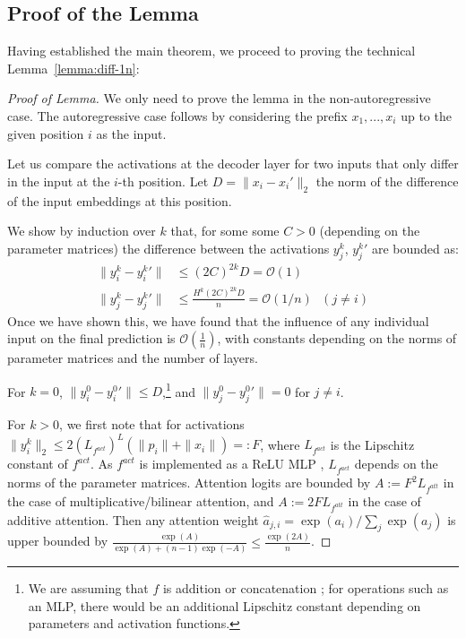 \documentclass[11pt,a4paper]{article}
\newcounter{theorem}
\begin{document}
\subsection{Proof of the Lemma}
Having established the main theorem, we proceed to proving the technical Lemma~\ref{lemma:diff-1n}:
\begin{proof}[Proof of Lemma]
We only need to prove the lemma in the non-autoregressive case.
The autoregressive case follows by considering the prefix $x_1, ..., x_i$ up to the given position $i$ as the input.

Let us compare the activations at the decoder layer for two inputs that only differ in the input at the $i$-th position.
Let $D = \|x_i-x_i'\|_2$ the norm of the difference of the input embeddings at this position.

	We show by induction over $k$ that, for some some $C > 0$ (depending on the parameter matrices) the difference between the activations $y_j^k$, ${y_j^k}'$ are bounded as: %
\begin{equation}
\begin{aligned}
	\|y_i^k-{y_i^k}'\| &\leq (2C)^{2k}D = \mathcal{O}(1) \\
	\|y_j^k-{y_j^k}'\| &\leq \frac{H^k (2C)^{2k}D}{n} = \mathcal{O}(1/n)\ \ \ (j \neq i)
	\end{aligned}
\end{equation}
Once we have shown this, we have found that the influence of any individual input on the final prediction is $\mathcal{O}(\frac{1}{n})$, with constants depending on the norms of parameter matrices and the number of layers.


For $k=0$, $\|y_i^0 - {y_i^0}'\| \leq D$,\footnote{We are assuming that $f$ is addition or concatenation \cite{vaswani2017attention}; for operations such as an MLP, there would be an additional Lipschitz constant depending on parameters and activation functions.}
and %
$\|y_j^0 - {y_j^0}'\| = 0$ for $j \neq i$.

For $k>0$, we first note that for activations $\|y_i^k\|_2 \leq 2 \left(L_{f^{act}}\right)^{L}  (\|p_i\| + \|x_i\|) =: F$, where
$L_{f^{act}}$ is the Lipschitz constant of $f^{act}$.
As $f^{act}$ is implemented as a ReLU MLP \cite{vaswani2017attention}, $L_{f^{act}}$ depends on the norms of the parameter matrices.
Attention logits are bounded by $A := F^2 L_{f^{att}}$ in the case of multiplicative/bilinear attention, and $A := 2 F L_{f^{att}}$ in the case of additive attention.
Then any attention weight $\widehat{a}_{j,i} = \exp(a_i)/\sum_j \exp(a_j)$ is upper bounded by $\frac{\exp(A)}{\exp(A) + (n-1) \exp(-A)} \leq \frac{\exp(2A)}{n}$.


\end{proof}
\end{document}
